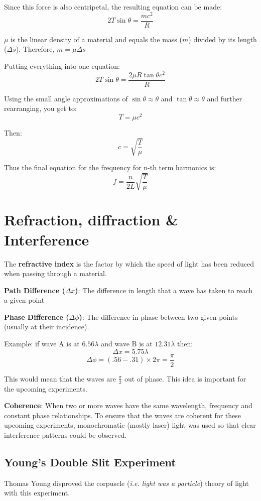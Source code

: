 \documentclass{article}
\begin{document}
Since this force is also centripetal, the resulting equation can be made:
$$2T\sin{\theta} = \frac{mc^2}{R}$$

$\mu$ is the linear density of a material and equals the mass ($m$) divided by its length ($\Delta s$). Therefore, $m = \mu\Delta s$

Putting everything into one equation:
$$2T\sin{\theta} = \frac{2\mu R \tan{\theta} c^2}{R}$$

Using the small angle approximations of $\sin{\theta} \approx \theta$ and $\tan{\theta} \approx \theta$ and further rearranging, you get to:
$$T = \mu c^2$$

Then:
$$c = \sqrt{\frac{T}{\mu}}$$

Thus the final equation for the frequency for n-th term harmonics is:
$$f = \frac{n}{2L}\sqrt{\frac{T}{\mu}}$$

\section{Refraction, diffraction \& Interference}
The \textbf{refractive index} is the factor by which the speed of light has been reduced when passing through a material. 

\textbf{Path Difference ($\Delta x$)}: The difference in length that a wave has taken to reach a given point 

\textbf{Phase Difference ($\Delta\phi$)}: The difference in phase between two given points (usually at their incidence).

Example: if wave A is at $6.56\lambda$ and wave B is at $12.31\lambda$ then:
$$\Delta x = 5.75\lambda$$
$$\Delta\phi = (.56 - .31) \times 2\pi = \frac{\pi}{2}$$

This would mean that the waves are $\frac{\pi}{2}$ out of phase. This idea is important for the upcoming experiments.

\textbf{Coherence}: When two or more waves have the same wavelength, frequency and constant phase relationships. To ensure that the waves are coherent for these upcoming experiments, monochromatic (mostly laser) light was used so that clear interference patterns could be observed. 

\subsection{Young's Double Slit Experiment}
Thomas Young disproved the corpuscle (\textit{i.e. light was a particle}) theory of light with this experiment.
\end{document}
